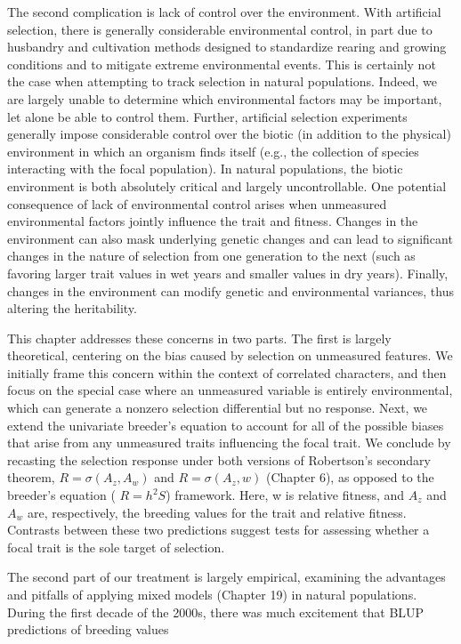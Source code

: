 \documentclass{article}
\begin{document}
The second complication is lack of control over the environment. With artificial selection, there is generally considerable environmental control, in part due to husbandry and cultivation methods designed to standardize rearing and growing conditions and to mitigate extreme environmental events. This is certainly not the case when attempting to track selection in natural populations. Indeed, we are largely unable to determine which environmental factors may be important, let alone be able to control them. Further, artificial selection experiments generally impose considerable control over the biotic (in addition to the physical) environment in which an organism finds itself (e.g., the collection of species interacting with the focal population). In natural populations, the biotic environment is both absolutely critical and largely uncontrollable. One potential consequence of lack of environmental control arises when unmeasured environmental factors jointly influence the trait and fitness. Changes in the environment can also mask underlying genetic changes and can lead to significant changes in the nature of selection from one generation to the next (such as favoring larger trait values in wet years and smaller values in dry years). Finally, changes in the environment can modify genetic and environmental variances, thus altering the heritability.

This chapter addresses these concerns in two parts. The first is largely theoretical, centering on the bias caused by selection on unmeasured features. We initially frame this concern within the context of correlated characters, and then focus on the special case where an unmeasured variable is entirely environmental, which can generate a nonzero selection differential but no response. Next, we extend the univariate breeder's equation to account for all of the possible biases that arise from any unmeasured traits influencing the focal trait. We conclude by recasting the selection response under both versions of Robertson's secondary theorem,  $ R = \sigma(A_z, A_w) $ and  $ R = \sigma(A_z, w) $ (Chapter 6), as opposed to the breeder's equation ( $ R = h^2 S $) framework. Here, w is relative fitness, and  $ A_z $ and  $ A_w $ are, respectively, the breeding values for the trait and relative fitness. Contrasts between these two predictions suggest tests for assessing whether a focal trait is the sole target of selection.

The second part of our treatment is largely empirical, examining the advantages and pitfalls of applying mixed models (Chapter 19) in natural populations. During the first decade of the 2000s, there was much excitement that BLUP predictions of breeding values
\end{document}
